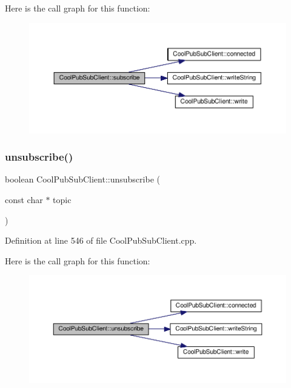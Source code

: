 Here is the call graph for this function\+:
\nopagebreak
\begin{figure}[H]
\begin{center}
\leavevmode
\includegraphics[width=350pt]{class_cool_pub_sub_client_aebf684e98588c52a72af1014f7957bee_cgraph}
\end{center}
\end{figure}
\mbox{\label{class_cool_pub_sub_client_a850554280e314d6b5c33c73fd9e809fc}} 
\subsubsection{\texorpdfstring{unsubscribe()}{unsubscribe()}}
{\footnotesize\ttfamily boolean Cool\+Pub\+Sub\+Client\+::unsubscribe (\begin{DoxyParamCaption}\item[{const char $\ast$}]{topic }\end{DoxyParamCaption})}



Definition at line 546 of file Cool\+Pub\+Sub\+Client.\+cpp.

Here is the call graph for this function\+:
\nopagebreak
\begin{figure}[H]
\begin{center}
\leavevmode
\includegraphics[width=350pt]{class_cool_pub_sub_client_a850554280e314d6b5c33c73fd9e809fc_cgraph}
\end{center}
\end{figure}
\mbox{\label{class_cool_pub_sub_client_a7a8e4854a1846eaa668046d3854d47ad}} 
